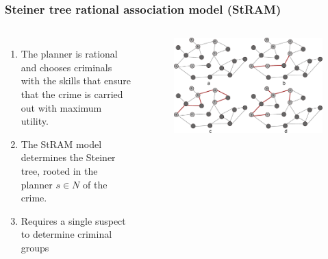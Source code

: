 \documentclass[aspectratio=169]{beamer}
\begin{document}
\begin{frame}
\frametitle{Steiner tree rational association model (StRAM)}
  \begin{columns}
    \begin{enumerate}
      \item The planner is rational and chooses criminals with the skills that ensure that the crime is carried out with maximum utility.
      \item The StRAM model determines the Steiner tree, rooted in the planner $s \in N$ of the crime.
      \item Requires a single suspect to determine criminal groups
    \end{enumerate}
    \begin{figure}[ht]
      \centering
      \includegraphics[width=\textwidth]{images/stram-network.pdf}
    \end{figure}
  \end{columns}
\end{frame}
\end{document}
